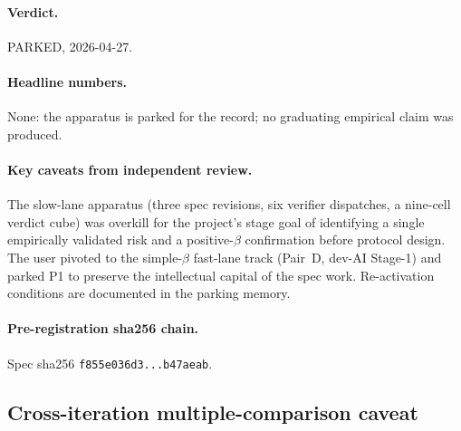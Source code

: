 \paragraph{Verdict.} PARKED, 2026-04-27.

\paragraph{Headline numbers.} None: the apparatus is parked for the
record; no graduating empirical claim was produced.

\paragraph{Key caveats from independent review.} The slow-lane
apparatus (three spec revisions, six verifier dispatches, a nine-cell
verdict cube) was overkill for the project's stage goal of identifying
a single empirically validated risk and a positive-\(\beta\) confirmation
before protocol design. The user pivoted to the simple-\(\beta\)
fast-lane track (Pair~D, dev-AI Stage-1) and parked P1 to preserve the
intellectual capital of the spec work. Re-activation conditions are
documented in the parking memory.

\paragraph{Pre-registration sha256 chain.} Spec sha256
\texttt{f855e036d3...b47aeab}.

\subsection{Cross-iteration multiple-comparison caveat}\label{sec:6.6}

